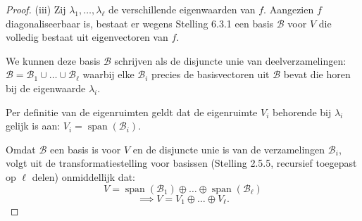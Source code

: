 \begin{proof}(iii)
    Zij $\lambda_1, \dots, \lambda_\ell$ de verschillende eigenwaarden van $f$.
    Aangezien $f$ diagonaliseerbaar is, bestaat er wegens Stelling 6.3.1 een basis $\mathcal{B}$ voor $V$ die volledig bestaat uit eigenvectoren van $f$. 
    
    We kunnen deze basis $\mathcal{B}$ schrijven als de disjuncte unie van deelverzamelingen:
    \(\mathcal{B} = \mathcal{B}_1 \cup \dots \cup \mathcal{B}_\ell \)
    waarbij elke $\mathcal{B}_i$ precies de basisvectoren uit $\mathcal{B}$ bevat die horen bij de eigenwaarde $\lambda_i$.
    
    Per definitie van de eigenruimten geldt dat de eigenruimte $V_i$ behorende bij $\lambda_i$ gelijk is aan:
    \(V_i = \operatorname{span}(\mathcal{B}_i). \)
    
    Omdat $\mathcal{B}$ een basis is voor $V$ en de disjuncte unie is van de verzamelingen $\mathcal{B}_i$, volgt uit de transformatiestelling voor basissen (Stelling 2.5.5, recursief toegepast op $\ell$ delen) onmiddellijk dat:
    \[ V = \operatorname{span}(\mathcal{B}_1) \oplus \dots \oplus \operatorname{span}(\mathcal{B}_\ell) \]
    \[ \implies V = V_1 \oplus \dots \oplus V_\ell. \]
\end{proof}

